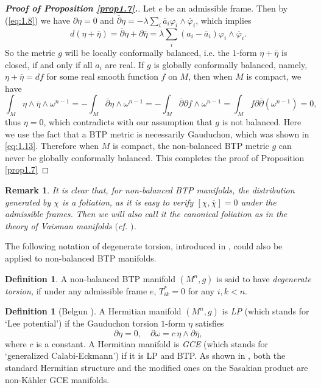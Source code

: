 \documentclass{amsart}
\numberwithin{equation}{section}
\newtheorem{remark}  [theorem]     {Remark}
\theoremstyle{definition}
\newtheorem{definition}  [theorem]     {Definition}
\renewcommand{\1}{\mathds{1}}
\renewcommand{\>}{\rightarrow}
\begin{document}
\begin{proof}[{\bf Proof of Proposition \ref{prop1.7}.}]
Let $e$ be an admissible frame. Then by (\ref{eq:1.8}) we have $\partial \eta =0$ and $\overline{\partial}\eta = -\lambda \sum_i \overline{a}_i \varphi_i \wedge \overline{\varphi}_i $, which implies
$$ d(\eta + \overline{\eta}) = \overline{\partial}\eta + \partial \overline{\eta}
= \lambda \sum_i (a_i - \overline{a}_i) \varphi_i \wedge \overline{\varphi}_i.$$
So the metric $g$ will be locally conformally balanced, i.e. the $1$-form $\eta + \overline{\eta} $ is closed,
if and only if all $a_i$ are real. If $g$ is globally conformally balanced, namely,
$\eta +\overline{\eta} = df$ for some real smooth function $f$ on $M$, then when $M$ is compact, we have
$$ \int_M \eta \wedge \overline{\eta} \wedge \omega^{n-1} = - \int_M \overline{\partial}\eta \wedge \omega^{n-1} = -\int_M \overline{\partial}\partial f \wedge \omega^{n-1} = \int_M f \partial\overline{\partial} (\omega^{n-1}) =0,$$
thus $\eta =0$, which contradicts with our assumption that $g$ is not balanced.
Here we use the fact that a BTP metric is necessarily Gauduchon, which was shown in \eqref{eq:1.13}.
Therefore when $M$ is compact, the non-balanced BTP metric $g$ can never be globally conformally balanced.
This completes the proof of Proposition \ref{prop1.7}
\end{proof}

\begin{remark}
It is clear that, for non-balanced BTP manifolds, the distribution generated by $\chi$ is a foliation,
as it is easy to verify $[\chi,\overline{\chi}]=0$ under the admissible frames.
Then we will also call it the canonical foliation as in the theory of Vaisman manifolds $($cf. \cite{Ts94,Ts97,OV22,Ist}$)$.
\end{remark}

The following notation of degenerate torsion, introduced in \cite[Defintion 5]{YZZ}, could also be applied to non-balanced BTP manifolds.

\begin{definition}\label{degtor_def}
A non-balanced BTP manifold $(M^n,g)$ is said to have {\em degenerate torsion,}
if under any admissible frame $e$, $T^{\ast }_{ik}=0$ for any $i,k <n$.
\end{definition}

\begin{definition}[Belgun \cite{B12}]\label{LP_GCE}
A Hermitian manifold $(M^n,g)$ is {\em LP} (which stands for `Lee potential') if the Gauduchon torsion $1$-form $\eta$ satisfies
\[\partial \eta =0 , \quad \partial \omega = c \,\eta \wedge\partial \overline{\eta},\]
where $c$ is a constant. A Hermitian manifold is {\em GCE}  (which stands for `generalized Calabi-Eckmann') if it is LP and BTP.
As shown in \cite[Proposition 3.2]{B12}, both the standard Hermitian structure and the modified ones on the Sasakian product are non-K\"ahler GCE manifolds.
\end{definition}
\end{document}

